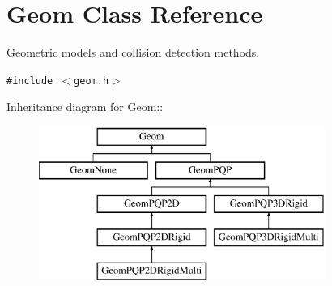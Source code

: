 \section{Geom  Class Reference}
\label{class_Geom}
Geometric models and collision detection methods. 


{\tt \#include $<$geom.h$>$}

Inheritance diagram for Geom::\begin{figure}[H]
\begin{center}
\leavevmode
\includegraphics[height=5cm]{class_Geom}
\end{center}
\end{figure}
